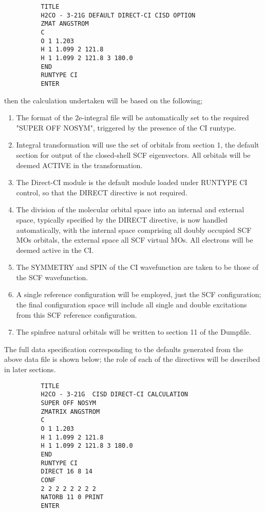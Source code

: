 \documentclass[11pt,fleqn]{article}
\begin{document}
{
\footnotesize
\begin{verbatim}
          TITLE
          H2CO - 3-21G DEFAULT DIRECT-CI CISD OPTION
          ZMAT ANGSTROM
          C
          O 1 1.203
          H 1 1.099 2 121.8
          H 1 1.099 2 121.8 3 180.0
          END
          RUNTYPE CI
          ENTER
\end{verbatim}
}
then the calculation undertaken will be based on the following;
\begin{enumerate}
\item The format of the 2e-integral file will be automatically set to
the required "SUPER OFF NOSYM", triggered by the presence of the
CI runtype.
\item Integral transformation will use the set of orbitals from section
1, the default section for output of the closed-shell SCF eigenvectors.
All orbitals will be deemed ACTIVE in the transformation.
\item The Direct-CI module is the default module loaded under
RUNTYPE CI control, so that the DIRECT directive is not required.
\item The division of the molecular orbital space into an internal and
external space, typically specified by the DIRECT directive, is now
handled automatically, with the internal space comprising all doubly
occupied SCF MOs orbitals, the external space all SCF virtual MOs. All
electrons will be deemed active in the CI.
\item The SYMMETRY and SPIN of the CI wavefunction are taken to be
those of the SCF wavefunction.
\item A single reference configuration will be employed, just
the SCF configuration; the final configuration space will include
all single and double excitations from this SCF reference configuration.
\item The spinfree natural orbitals will be written to section
11 of the Dumpfile.
\end{enumerate}

The full data specification corresponding to the defaults generated
from the above data file is shown below; the role of each of the
directives will be described in later sections.

{
\footnotesize
\begin{verbatim}
          TITLE
          H2CO - 3-21G  CISD DIRECT-CI CALCULATION
          SUPER OFF NOSYM
          ZMATRIX ANGSTROM
          C
          O 1 1.203
          H 1 1.099 2 121.8
          H 1 1.099 2 121.8 3 180.0
          END
          RUNTYPE CI
          DIRECT 16 8 14
          CONF
          2 2 2 2 2 2 2 2
          NATORB 11 0 PRINT
          ENTER
\end{verbatim}
}
\end{document}
